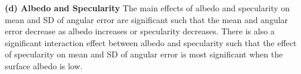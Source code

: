 \textbf{(d) Albedo and Specularity} 
The main effects of albedo and specularity on mean and SD of angular error are significant such that the mean and angular error decrease as albedo increases or specularity decreases. There is also a significant interaction effect between albedo and specularity such that the effect of specularity on mean and SD of angular error is most significant when the surface albedo is low.
